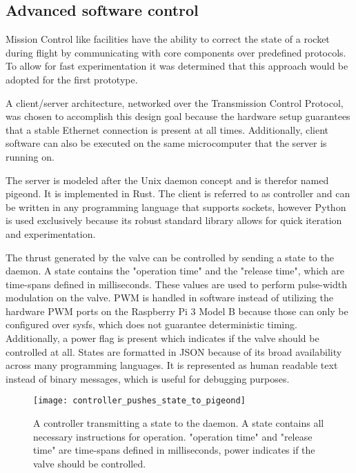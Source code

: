 \subsection{Advanced software control}
Mission Control like facilities have the ability to correct the state of a rocket during flight by communicating with core components over predefined protocols. To allow for fast experimentation it was determined that this approach would be adopted for the first prototype.

A client/server architecture, networked over the Transmission Control Protocol, was chosen to accomplish this design goal because the hardware setup guarantees that a stable Ethernet connection is present at all times. Additionally, client software can also be executed on the same microcomputer that the server is running on.

The server is modeled after the Unix daemon concept and is therefor named pigeond. It is implemented in Rust. The client is referred to as controller and can be written in any programming language that supports sockets, however Python is used exclusively because its robust standard library allows for quick iteration and experimentation.

The thrust generated by the valve can be controlled by sending a state to the daemon. A state contains the "operation time" and the "release time", which are time-spans defined in milliseconds. These values are used to perform pulse-width modulation on the valve. PWM is handled in software instead of utilizing the hardware PWM ports on the Raspberry Pi 3 Model B because those can only be configured over sysfs, which does not guarantee deterministic timing. Additionally, a power flag is present which indicates if the valve should be controlled at all. States are formatted in JSON \cite{json} because of its broad availability across many programming languages. It is represented as human readable text instead of binary messages, which is useful for debugging purposes. 

\begin{figure}[h]
\centering

\texttt{[image: controller\_pushes\_state\_to\_pigeond]}

\caption{A controller transmitting a state to the daemon. A state contains all necessary instructions for operation. "operation time" and "release time" are time-spans defined in milliseconds, power indicates if the valve should be controlled.}
\end{figure}

